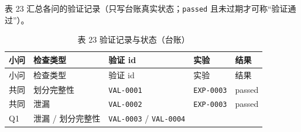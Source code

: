 \documentclass[
  a4paper,12pt]{article}
\begin{document}
表 23 汇总各问的验证记录（只写台账真实状态；\texttt{passed}
且未过期才可称``验证通过''）。

\begin{longtable}[]{@{}
  >{\raggedright\arraybackslash}p{}
  >{\raggedright\arraybackslash}p{}
  >{\raggedright\arraybackslash}p{}
  >{\raggedright\arraybackslash}p{}
  >{\raggedright\arraybackslash}p{}@{}}
\caption{表 23 验证记录与状态（台账）}\tabularnewline
\toprule\noalign{}
\begin{minipage}[b]{\linewidth}\raggedright
小问
\end{minipage} & \begin{minipage}[b]{\linewidth}\raggedright
检查类型
\end{minipage} & \begin{minipage}[b]{\linewidth}\raggedright
验证 id
\end{minipage} & \begin{minipage}[b]{\linewidth}\raggedright
实验
\end{minipage} & \begin{minipage}[b]{\linewidth}\raggedright
结果
\end{minipage} \\
\midrule\noalign{}
\endfirsthead
\toprule\noalign{}
\begin{minipage}[b]{\linewidth}\raggedright
小问
\end{minipage} & \begin{minipage}[b]{\linewidth}\raggedright
检查类型
\end{minipage} & \begin{minipage}[b]{\linewidth}\raggedright
验证 id
\end{minipage} & \begin{minipage}[b]{\linewidth}\raggedright
实验
\end{minipage} & \begin{minipage}[b]{\linewidth}\raggedright
结果
\end{minipage} \\
\midrule\noalign{}
\endhead
\bottomrule\noalign{}
\endlastfoot
共同 & 划分完整性 & \texttt{VAL-0001} & \texttt{EXP-0003} & passed \\
共同 & 泄漏 & \texttt{VAL-0002} & \texttt{EXP-0003} & passed \\
Q1 & 泄漏 / 划分完整性 & \texttt{VAL-0003} / \texttt{VAL-0004} &

\end{longtable}
\end{document}
